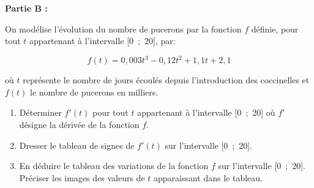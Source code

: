\textbf{Partie B :}

\medskip

On modélise l'évolution du nombre de pucerons par la fonction $f$ définie, pour tout $t$ appartenant à l'intervalle [0~;~20], par:

\[f(t) = 0,003t^3 - 0,12t^2 + 1,1t + 2,1\]

où $t$ représente le nombre de jours écoulés depuis l'introduction des coccinelles et
$f(t)$ le nombre de pucerons en milliers.

\medskip

\begin{enumerate}
\item Déterminer $f'(t)$ pour tout $t$ appartenant à l'intervalle [0~;~20] où $f'$ désigne la
dérivée de la fonction $f$.
\item Dresser le tableau de signes de $f'(t)$ sur l'intervalle [0~;~20].
\item En déduire le tableau des variations de la fonction $f$ sur l'intervalle [0~;~20]. Préciser les images des valeurs de $t$ apparaissant dans le tableau.
\end{enumerate}
